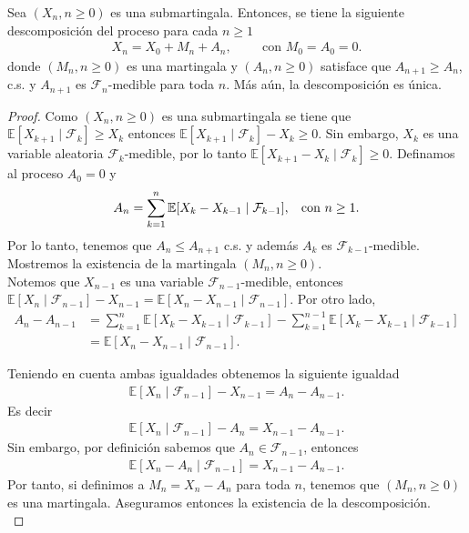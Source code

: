 \begin{theorem}
\label{descdoob}
	Sea $(X_n, n \geq 0)$ es una submartingala. Entonces, se tiene la siguiente descomposición del proceso para cada $n \geq 1$
	\begin{align*}
	X_n = X_0 + M_n + A_n, \hspace{1cm} \text{con    } M_0 = A_0 = 0.
	\end{align*}
	donde $(M_n, n \geq 0)$ es una martingala y $(A_n, n \geq 0)$ satisface que $A_{n+1} \geq A_n$, c.s. y $A_{n+1}$ es $\mathcal{F}_n$-medible para toda $n$. Más aún, la descomposición es única.
\end{theorem}
\begin{proof}
	Como $(X_n, n \geq 0)$ es una submartingala se tiene que $\mathbb{E}[X_{k+1} \mid \mathcal{F}_k] \geq X_k$ entonces $\mathbb{E}[X_{k+1} \mid \mathcal{F}_k] - X_k \geq 0$. Sin embargo, $X_k$ es una variable aleatoria $\mathcal{F}_k$-medible, por lo tanto $\mathbb{E}[X_{k+1} - X_k \mid \mathcal{F}_k] \geq 0$.
	Definamos al proceso $A_0 = 0$ y
	\begin{align*}
	A_n = \sum_{k=1}^{n} \mathbb{E}[X_k - X_{k-1} \mid \mathcal{F}_{k-1}], \hspace{0.3cm} \text{con } n \geq 1.
	\end{align*}
	Por lo tanto, tenemos que $A_n \leq A_{n+1}$ c.s. y además $A_k$ es $\mathcal{F}_{k-1}$-medible. Mostremos la existencia de la martingala $(M_n, n \geq 0)$. \\
	
	Notemos que $X_{n-1}$ es una variable $\mathcal{F}_{n-1}$-medible, entonces $\mathbb{E}[X_n \mid \mathcal{F}_{n-1}] - X_{n-1} = \mathbb{E}[X_n - X_{n-1} \mid \mathcal{F}_{n-1}]$. Por otro lado, 
	\begin{align*}
	A_n - A_{n-1} & = \sum_{k=1}^{n} \mathbb{E}[X_k - X_{k-1} \mid \mathcal{F}_{k-1}] - \sum_{k=1}^{n-1} \mathbb{E}[X_k - X_{k-1} \mid \mathcal{F}_{k-1}] \\
	& = \mathbb{E}[X_n - X_{n-1} \mid \mathcal{F}_{n-1}]. 
	\end{align*}
	
	\noindent Teniendo en cuenta ambas igualdades obtenemos la siguiente igualdad
	\begin{align*}
		\mathbb{E}[X_n \mid \mathcal{F}_{n-1}] - X_{n-1} = A_n - A_{n-1}.
	\end{align*}
	Es decir
	\begin{align*}
		\mathbb{E}[X_n \mid \mathcal{F}_{n-1}] - A_n = X_{n-1} - A_{n-1}.
	\end{align*}
	Sin embargo, por definición sabemos que $A_n \in \mathcal{F}_{n-1}$, entonces 
	\begin{align*}
		\mathbb{E}[X_n - A_n \mid \mathcal{F}_{n-1}] = X_{n-1} - A_{n-1}.
	\end{align*}
	Por tanto, si definimos a $M_n = X_n - A_n$ para toda $n$, tenemos que $(M_n, n \geq 0)$ es una martingala. Aseguramos entonces la existencia de la descomposición. \\
	

\end{proof}
